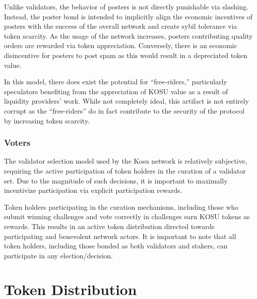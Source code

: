 \documentclass[10pt]{article}
\begin{document}
Unlike validators, the behavior of posters is not directly punishable via slashing. Instead, the poster bond is intended to implicitly align the economic incentives of posters with the success of the overall network and create sybil tolerance via token scarcity. As the usage of the network increases, posters contributing quality orders are rewarded via token appreciation. Conversely, there is an economic disincentive for posters to post spam as this would result in a depreciated token value.
\medskip

In this model, there does exist the potential for ``free-riders,'' particularly speculators benefiting from the appreciation of KOSU value as a result of liquidity providers’ work. While not completely ideal, this artifact is not entirely corrupt as the ``free-riders'' do in fact contribute to the security of the protocol by increasing token scarcity. 

\subsubsection{Voters}\label{incentive-models-voters}
The validator selection model used by the Kosu network is relatively subjective, requiring the active participation of token holders in the curation of a validator set. Due to the magnitude of such decisions, it is important to maximally incentivize participation via explicit participation rewards. 
\medskip

Token holders participating in the curation mechanisms, including those who submit winning challenges and vote correctly in challenges earn KOSU tokens as rewards. This results in an active token distribution directed towards participating and benevolent network actors. It is important to note that all token holders, including those bonded as both validators and stakers, can participate in any election/decision.

\clearpage
\pagebreak


\section{Token Distribution}\label{token-distribution}
\end{document}
